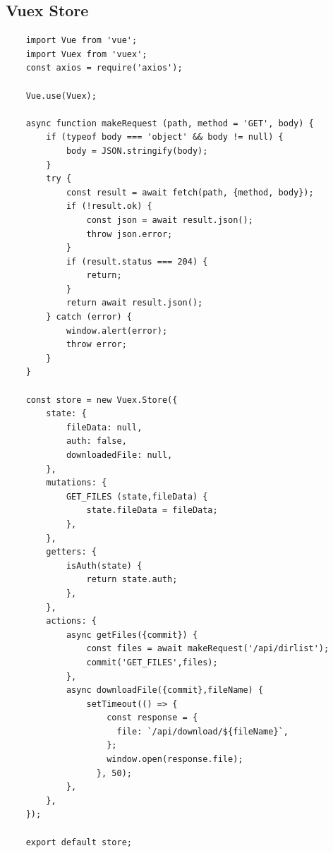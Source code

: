 \documentclass[12pt]{article}
\begin{document}
\subsection{Vuex Store}
\begin{verbatim}
	import Vue from 'vue';
	import Vuex from 'vuex';
	const axios = require('axios');
	
	Vue.use(Vuex);
	
	async function makeRequest (path, method = 'GET', body) {
		if (typeof body === 'object' && body != null) {
			body = JSON.stringify(body);
		}
		try {
			const result = await fetch(path, {method, body});
			if (!result.ok) {
				const json = await result.json();
				throw json.error;
			}
			if (result.status === 204) {
				return;
			}
			return await result.json();
		} catch (error) {
			window.alert(error);
			throw error;
		}
	}
	
	const store = new Vuex.Store({
		state: {
			fileData: null,
			auth: false,
			downloadedFile: null,
		},
		mutations: {
			GET_FILES (state,fileData) {
				state.fileData = fileData;
			},
		},
		getters: {
			isAuth(state) {
				return state.auth;
			},
		},
		actions: {
			async getFiles({commit}) {
				const files = await makeRequest('/api/dirlist');
				commit('GET_FILES',files);
			},
			async downloadFile({commit},fileName) {
				setTimeout(() => {
					const response = {
					  file: `/api/download/${fileName}`,
					};
					window.open(response.file);
				  }, 50);
			},
		},
	});
	
	export default store;
\end{verbatim}
\end{document}
